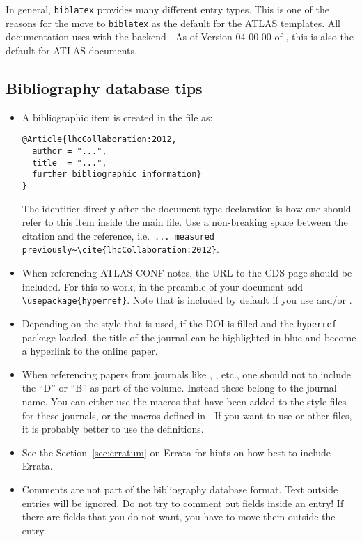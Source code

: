 \documentclass[UKenglish, texlive=2016]{\ATLASLATEXPATH atlasdoc}
\begin{document}
In general, \texttt{biblatex} provides many different entry types.
This is one of the reasons for the  move to \texttt{biblatex} as the default for the ATLAS templates.
All  documentation uses  with the backend .
As of Version 04-00-00 of , this is also the default for ATLAS documents.


\subsection{Bibliography database tips}

\begin{itemize}
\item A bibliographic item is created in the  file as:
\begin{verbatim}
@Article{lhcCollaboration:2012,
  author = "...",
  title  = "...",
  further bibliographic information}
}
\end{verbatim}
  The identifier directly after the document type declaration is how one should refer to this item inside the main  file.
  Use a non-breaking space between the citation and the reference, i.e.\
  \verb|... measured previously~\cite{lhcCollaboration:2012}|.
\item When referencing ATLAS CONF notes, the URL to the CDS page should be included.
  For this to work, in the preamble of your \File{.tex} document add
  \texttt{\textbackslash usepackage\{hyperref\}}.
  Note that  is included by default if you use  and/or .
\item Depending on the style that is used,
  if the DOI is filled and the \texttt{hyperref} package loaded,
  the title of the journal can be highlighted in blue and become a hyperlink to the online paper.
\item When referencing papers from journals like \PRD, \PLB, etc.,
  one should not to include the \enquote{D} or \enquote{B} as part of the volume.
  Instead these belong to the journal name.
  You can either use the macros that have been added to the  style files for these journals, or
  the macros defined in .
  If you want to use  or other  files, it is probably better to use the
  \Package{atlasjournal} definitions.
\item See the Section~{\ref{sec:erratum}} on Errata for hints on how best to include Errata.
\item Comments are not part of the bibliography database format. Text outside entries will be ignored.
  Do not try to comment out fields inside an entry!
  If there are fields that you do not want, you have to move them outside the entry.
\end{itemize}
\end{document}
